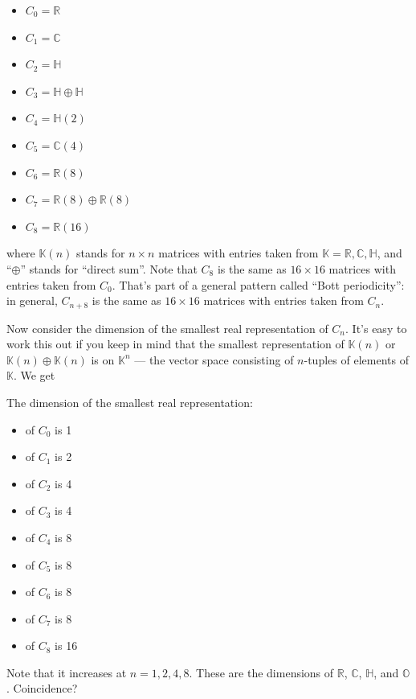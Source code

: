 \documentclass{article}
\def\tightlist{}
\begin{document}
\begin{itemize}
\tightlist
\item
  \(C_0 = \mathbb{R}\)
\item
  \(C_1 = \mathbb{C}\)
\item
  \(C_2 = \mathbb{H}\)
\item
  \(C_3 = \mathbb{H}\oplus\mathbb{H}\)
\item
  \(C_4 = \mathbb{H}(2)\)
\item
  \(C_5 = \mathbb{C}(4)\)
\item
  \(C_6 = \mathbb{R}(8)\)
\item
  \(C_7 = \mathbb{R}(8)\oplus\mathbb{R}(8)\)
\item
  \(C_8 = \mathbb{R}(16)\)
\end{itemize}

where \(\mathbb{K}(n)\) stands for \(n\times n\) matrices with entries
taken from \(\mathbb{K} = \mathbb{R}, \mathbb{C}, \mathbb{H}\), and
``\(\oplus\)'' stands for ``direct sum''. Note that \(C_8\) is the same
as \(16\times16\) matrices with entries taken from \(C_0\). That's part
of a general pattern called ``Bott periodicity'': in general,
\(C_{n+8}\) is the same as \(16\times16\) matrices with entries taken
from \(C_n\).

Now consider the dimension of the smallest real representation of
\(C_n\). It's easy to work this out if you keep in mind that the
smallest representation of \(\mathbb{K}(n)\) or
\(\mathbb{K}(n)\oplus \mathbb{K}(n)\) is on \(\mathbb{K}^n\) --- the
vector space consisting of \(n\)-tuples of elements of \(\mathbb{K}\).
We get

The dimension of the smallest real representation:

\begin{itemize}
\tightlist
\item
  of \(C_0\) is 1
\item
  of \(C_1\) is 2
\item
  of \(C_2\) is 4
\item
  of \(C_3\) is 4
\item
  of \(C_4\) is 8
\item
  of \(C_5\) is 8
\item
  of \(C_6\) is 8
\item
  of \(C_7\) is 8
\item
  of \(C_8\) is 16
\end{itemize}

Note that it increases at \(n = 1, 2, 4, 8\). These are the dimensions
of \(\mathbb{R}\), \(\mathbb{C}\), \(\mathbb{H}\), and \(\mathbb{O}\).
Coincidence?
\end{document}
